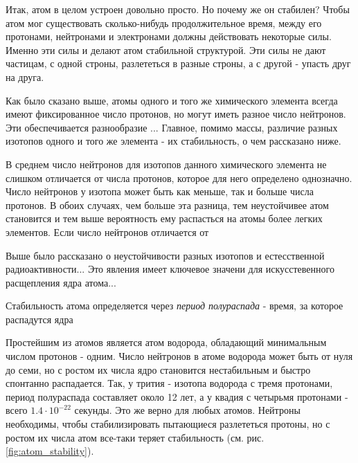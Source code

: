 Итак, атом в целом устроен довольно просто.
Но почему же он стабилен?
Чтобы атом мог существовать сколько-нибудь продолжительное время, между его протонами, нейтронами и электронами должны действовать некоторые силы.
Именно эти силы и делают атом стабильной структурой.
Эти силы не дают частицам, с одной строны, разлететься в разные строны, а с другой - упасть друг на друга.



Как было сказано выше, атомы одного и того же химического элемента всегда имеют фиксированное число протонов, но могут иметь разное число нейтронов. 
Эти обеспечивается разнообразие ...
Главное, помимо массы, различие разных изотопов одного и того же элемента - их стабильность, о чем рассказано ниже.



В среднем число нейтронов для изотопов данного химического элемента не слишком отличается от числа протонов, которое для него определено однозначно.
Число нейтронов у изотопа может быть как меньше, так и больше числа протонов.
В обоих случаях, чем больше эта разница, тем неустойчивее атом становится и тем выше вероятность ему распасться на атомы более легких элементов.
Если число нейтронов отличается от 

Выше было рассказано о неустойчивости разных изотопов и естесственной радиоактивности...
Это явления имеет ключевое значени для искусстевенного расщепления ядра атома...


Стабильность атома определяется через \textit{период полураспада} - время, за которое распадутся ядра 




Простейшим из атомов является атом водорода, обладающий минимальным числом протонов - одним.
Число нейтронов в атоме водорода может быть от нуля до семи, но с ростом их числа ядро становится нестабильным и быстро спонтанно распадается.
Так, у трития - изотопа водорода с тремя протонами, период полураспада составляет около 12 лет, а у квадия с четырьмя протонами - всего $1.4\cdot 10^{−22}$ секунды.
Это же верно для любых атомов.
Нейтроны необходимы, чтобы стабилизировать пытающиеся разлететься протоны, но с ростом их числа атом все-таки теряет стабильность (см. рис. \ref{fig:atom_stability}).



